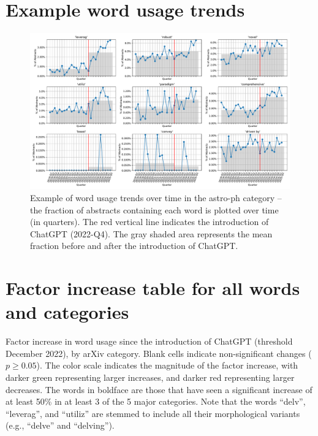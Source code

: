 \documentclass[twocolumn]{aastex701}
\begin{document}
\section{Example word usage trends}
\setcounter{figure}{0}
\setcounter{table}{0}

\begin{figure}[ht]
\centering
\includegraphics[width=\textwidth]{scripts/figs/example_usage_vs_time_astro-ph.pdf}
\caption{
Example of word usage trends over time in the astro-ph category -- the fraction of abstracts containing each word is plotted over time (in quarters).
The red vertical line indicates the introduction of ChatGPT (2022-Q4).
The gray shaded area represents the mean fraction before and after the introduction of ChatGPT.
}
\label{fig:word_usage_trends_example}
\end{figure}

\section{Factor increase table for all words and categories}
\setcounter{figure}{0}
\setcounter{table}{0}

\begin{table}[ht]
\centering
\scriptsize
\setlength{\tabcolsep}{3pt}

\caption{
Factor increase in word usage since the introduction of ChatGPT (threshold December 2022), by arXiv category.
Blank cells indicate non-significant changes ($p \geq 0.05$).
The color scale indicates the magnitude of the factor increase, with darker green representing larger increases, and darker red representing larger decreases.
The words in boldface are those that have seen a significant increase of at least 50\% in at least 3 of the 5 major categories.
Note that the words ``delv'', ``leverag'', and ``utiliz'' are stemmed to include all their morphological variants (e.g., ``delve'' and ``delving'').
}
\label{tab:factor_increase}
\end{table}
\end{document}
